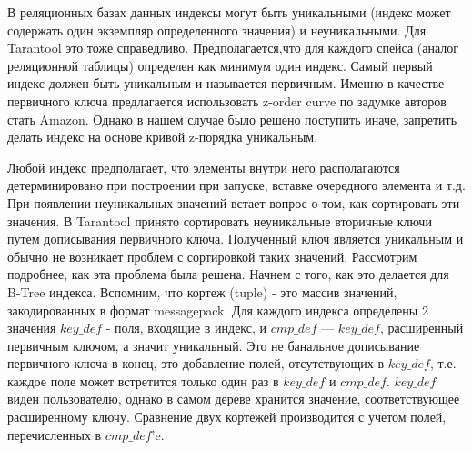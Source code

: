 В реляционных базах данных индексы могут быть уникальными (индекс может содержать один экземпляр определенного значения) и неуникальными. Для Tarantool это тоже справедливо. Предполагается,что  для каждого спейса (аналог реляционной таблицы) определен как минимум один индекс. Самый первый индекс должен быть уникальным и называется первичным. Именно в качестве первичного ключа предлагается использовать z-order curve по задумке авторов стать Amazon. Однако в нашем случае было решено поступить иначе, запретить делать индекс на основе кривой z-порядка уникальным.

Любой индекс предполагает, что элементы внутри него располагаются детерминировано при построении при запуске, вставке очередного элемента и т.д. При появлении неуникальных значений встает вопрос о том, как сортировать эти значения. В Tarantool принято сортировать неуникальные вторичные ключи путем дописывания первичного ключа. Полученный ключ является уникальным и обычно не возникает проблем с сортировкой таких значений. Рассмотрим подробнее, как эта проблема была решена. Начнем с того, как это делается для B-Tree индекса. Вспомним, что кортеж (tuple) - это массив значений, закодированных в формат messagepack. Для каждого индекса определены 2 значения $key\_def$ - поля, входящие в индекс, и $cmp\_def$ --- $key\_def$, расширенный первичным ключом, а значит уникальный. Это не банальное дописывание первичного ключа в конец, это добавление полей, отсутствующих в $key\_def$, т.е. каждое поле может встретится только один раз в $key\_def$ и $cmp\_def$. $key\_def$ виден пользователю, однако в самом дереве хранится значение, соответствующее расширенному ключу. Сравнение двух кортежей производится с учетом полей, перечисленных в $cmp\_def$’e.
